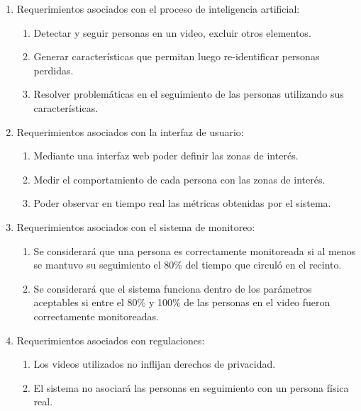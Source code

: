 \begin{enumerate}
\item Requerimientos asociados con el proceso de inteligencia artificial:
	\begin{enumerate}
	\item Detectar y seguir personas en un video, excluir otros elementos.
	\item Generar características que permitan luego re-identificar personas perdidas.
	\item Resolver problemáticas en el seguimiento de las personas utilizando sus características.
	\end{enumerate}
\item Requerimientos asociados con la interfaz de usuario:
	\begin{enumerate}
	\item Mediante una interfaz web poder definir las zonas de interés.
	\item Medir el comportamiento de cada persona con las zonas de interés.
	\item Poder observar en tiempo real las métricas obtenidas por el sistema.
	\end{enumerate}
\item Requerimientos asociados con el sistema de monitoreo:
\begin{enumerate}
	\item Se considerará que una persona es correctamente monitoreada si al menos se mantuvo su seguimiento el 80\% del tiempo que circuló en el recinto.
	\item Se considerará que el sistema funciona dentro de los parámetros aceptables si entre el 80\% y 100\% de las personas en el video fueron correctamente monitoreadas.
	\end{enumerate}
\item Requerimientos asociados con regulaciones:
\begin{enumerate}
	\item Los videos utilizados no inflijan derechos de privacidad.
	\item El sistema no asociará las personas en seguimiento con un persona física real.
	\end{enumerate}
\end{enumerate}

\newpage


